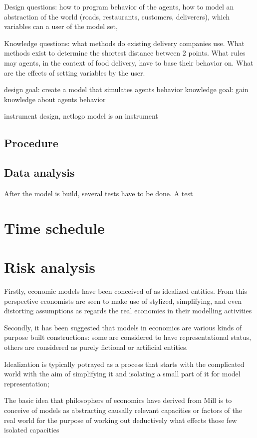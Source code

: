 Design questions: how to program behavior of the agents, how to model an abstraction of the world (roads, restaurants, customers, deliverers),
which variables can a user of the model set,

Knowledge questions: what methods do existing delivery companies use.
What methods exist to determine the shortest distance between 2 points.
What rules may agents, in the context of food delivery, have to base their behavior on.
What are the effects of setting variables by the user.

design goal: create a model that simulates agents behavior
knowledge goal: gain knowledge about agents behavior

instrument design, netlogo model is an instrument
\subsection{Procedure}

\subsection{Data analysis}
After the model is build, several tests have to be done.
A test

\section{Time schedule}


\section{Risk analysis}










Firstly, economic models have been conceived of as idealized entities.
From this perspective economists are seen to make use of stylized, simplifying,
and even distorting assumptions as regards the real economies in their modelling
activities

Secondly, it has been suggested that models in economics are various
kinds of purpose built constructions: some are considered to have representational
status, others are considered as purely fictional or artificial entities.



Idealization is typically potrayed as a process that starts
with the complicated world with the aim of simplifying it and isolating a small part
of it for model representation;

The basic idea that philosophers of economics have derived from Mill is to conceive
of models as abstracting causally relevant capacities or factors of the real world for
the purpose of working out deductively what effects those few isolated capacities
